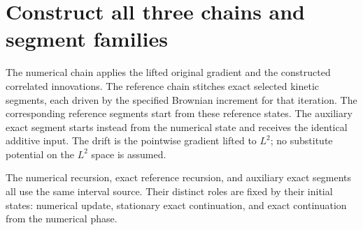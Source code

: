 \documentclass[11pt,a4paper]{article}
\begin{document}
\section{\texorpdfstring{Construct all three chains and segment families}{Construct all three chains and segment families}}


The numerical chain applies the lifted original gradient and the constructed correlated innovations. The reference chain stitches exact selected kinetic segments, each driven by the specified Brownian increment for that iteration. The corresponding reference segments start from these reference states. The auxiliary exact segment starts instead from the numerical state and receives the identical additive input. The drift is the pointwise gradient lifted to \(L^{2}\); no substitute potential on the \(L^{2}\) space is assumed.



The numerical recursion, exact reference recursion, and auxiliary exact segments all use the same interval source. Their distinct roles are fixed by their initial states: numerical update, stationary exact continuation, and exact continuation from the numerical phase.
\end{document}
